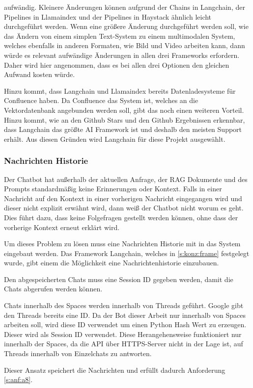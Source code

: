 aufwändig. Kleinere Änderungen können aufgrund der Chains in Langchain, der
Pipelines in Llamaindex und der Pipelines in Haystack ähnlich leicht durchgeführt werden. 
Wenn eine größere Änderung durchgeführt werden soll, wie das
Ändern von einem simplen Text-System zu einem multimodalen System, welches ebenfalls 
in anderen Formaten, wie Bild und Video arbeiten kann, dann würde es relevant aufwändige Änderungen in allen
drei Frameworks erfordern. Daher wird hier angenommen, dass es bei allen drei Optionen
den gleichen Aufwand kosten würde.\par
Hinzu kommt, dass Langchain und Llamaindex bereits Datenladesysteme für Confluence haben. 
Da Confluence das System ist, welches an die Vektordatenbank angebunden werden soll, gibt das noch 
einen weiteren Vorteil.
Hinzu kommt, wie an den Github Stars und den Github Ergebnissen erkennbar, dass 
Langchain das größte AI Framework ist und deshalb den meisten Support erhält. Aus diesen Gründen wird Langchain für diese Projekt ausgewählt.\par 

\subsubsection{Nachrichten Historie}
Der Chatbot hat außerhalb der aktuellen Anfrage, der RAG Dokumente und des Prompts 
standardmäßig keine Erinnerungen oder Kontext. 
Falls in einer Nachricht auf 
den Kontext in einer vorherigen Nachricht eingegangen wird und dieser 
nicht explizit erwähnt wird, dann weiß der Chatbot nicht worum es geht.
Dies führt dazu, dass keine Folgefragen gestellt werden können, ohne 
dass der vorherige Kontext erneut erklärt wird.\par
Um dieses Problem zu lösen muss eine Nachrichten Historie mit in das 
System eingebaut werden. Das Framework Langchain, welches in \ref{s:konz:frame} festgelegt 
wurde, gibt einem die Möglichkeit eine Nachrichtenhistorie einzubauen.\par
Den abgespeicherten Chats muss eine Session ID gegeben werden, damit 
die Chats abgerufen werden können. \par
Chats innerhalb des Spaces werden innerhalb von Threads geführt.
Google gibt den Threads bereits eine ID. Da der Bot dieser 
Arbeit nur innerhalb von Spaces arbeiten soll, 
wird diese ID verwendet um einen Python Hash Wert zu erzeugen.
Dieser wird als Session ID verwendet. Diese Herangehensweise funktioniert
nur innerhalb der Spaces, da die API über HTTPS-Server nicht in der Lage ist, auf 
Threads innerhalb von Einzelchats zu antworten.\par
Dieser Ansatz speichert die Nachrichten und erfüllt dadurch Anforderung 
\ref*{s:anf:a8}.

